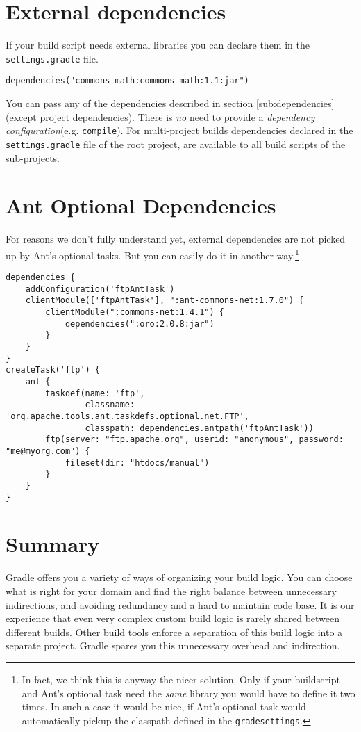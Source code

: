 \section{External dependencies} %
\label{sec:external_dependencies}
If your build script needs external libraries you can declare them in the \texttt{settings.gradle} file.
\begin{Verbatim}[label=settings.gradle]
dependencies("commons-math:commons-math:1.1:jar")
\end{Verbatim}
You can pass any of the dependencies described in section \ref{sub:dependencies} (except project dependencies). There is \emph{no} need to provide a \emph{dependency configuration}(e.g. \texttt{compile}). For multi-project builds dependencies declared in the \texttt{settings.gradle} file of the root project, are available to all build scripts of the sub-projects.

\section{Ant Optional Dependencies} %
\label{sec:ant_optional_dependencies}
For reasons we don't fully understand yet, external dependencies are not picked up by Ant's optional tasks. But you can easily do it in another way.\footnote{In fact, we think this is anyway the nicer solution. Only if your buildscript and Ant's optional task need the \emph{same} library you would have to define it two times. In such a case it would be nice, if Ant's optional task would automatically pickup the classpath defined in the \texttt{gradesettings}.}
\begin{Verbatim}[label=settings.gradle]
dependencies {
    addConfiguration('ftpAntTask')
    clientModule(['ftpAntTask'], ":ant-commons-net:1.7.0") {
        clientModule(":commons-net:1.4.1") {
            dependencies(":oro:2.0.8:jar")
        }
    }
}
createTask('ftp') {
    ant {
        taskdef(name: 'ftp',
                classname: 'org.apache.tools.ant.taskdefs.optional.net.FTP',
                classpath: dependencies.antpath('ftpAntTask'))
        ftp(server: "ftp.apache.org", userid: "anonymous", password: "me@myorg.com") {
            fileset(dir: "htdocs/manual")
        }
    }
}
\end{Verbatim}

\section{Summary} %
\label{sec:philosophy}
Gradle offers you a variety of ways of organizing your build logic. You can choose what is right for your domain and find the right balance between unnecessary indirections, and avoiding redundancy and a hard to maintain code base.
It is our experience that even very complex custom build logic is rarely shared between different builds. Other build tools enforce a separation of this build logic into a separate project. Gradle spares you this unnecessary overhead and indirection.


